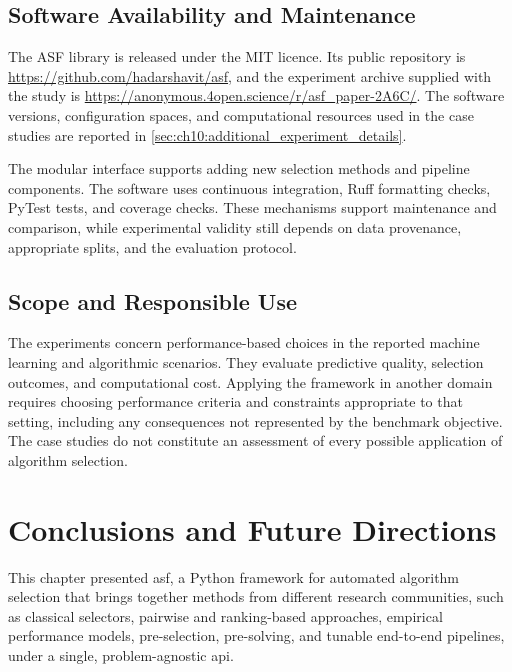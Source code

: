 \subsection{Software Availability and Maintenance}

The ASF library is released under the MIT licence. Its public repository is
\url{https://github.com/hadarshavit/asf}, and the experiment archive supplied
with the study is \url{https://anonymous.4open.science/r/asf_paper-2A6C/}.
The software versions, configuration spaces, and computational resources used
in the case studies are reported in
\cref{sec:ch10:additional_experiment_details}.

The modular interface supports adding new selection methods and pipeline
components. The software uses continuous integration, Ruff formatting checks,
PyTest tests, and coverage checks. These mechanisms support maintenance and
comparison, while experimental validity still depends on data provenance,
appropriate splits, and the evaluation protocol.

\subsection{Scope and Responsible Use}
\label{sec:ch10:imapct}

The experiments concern performance-based choices in the reported machine
learning and algorithmic scenarios. They evaluate predictive quality,
selection outcomes, and computational cost. Applying the framework in another
domain requires choosing performance criteria and constraints appropriate to
that setting, including any consequences not represented by the benchmark
objective. The case studies do not constitute an assessment of every possible
application of algorithm selection.

\section{Conclusions and Future Directions}
\label{sec:ch10:conclusion}
This chapter presented \gls{asf}, a Python framework for automated algorithm selection that brings together methods from different research communities, such as classical selectors, pairwise and ranking-based approaches, empirical performance models, pre-selection, pre-solving, and tunable end-to-end pipelines, under a single, problem-agnostic \gls{api}.

